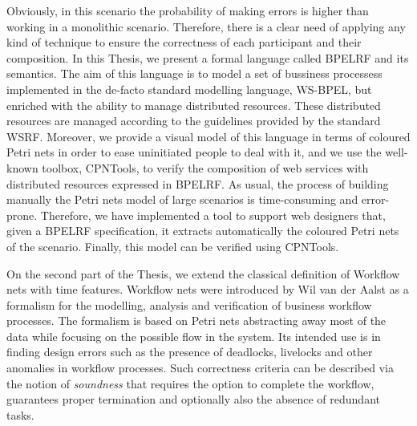 Obviously, in this scenario the probability of making errors is higher than working in a monolithic scenario. Therefore, there is
a clear need of applying any kind of technique to ensure the correctness of each participant and their composition.
In this Thesis, we present a formal language called BPELRF and its semantics. The aim of this language is
to model a set of bussiness processess implemented in the de-facto standard modelling language, WS-BPEL, but
enriched with the ability to manage distributed resources. These distributed resources are managed according to
the guidelines provided by the standard WSRF. Moreover, we provide a visual model of this language in terms of 
coloured Petri nets in order to ease uninitiated people to deal with it, and we use the well-known toolbox, CPNTools,
to verify the composition of web services with distributed resources expressed in BPELRF. As usual, the process of building manually
the Petri nets model of large scenarios is time-consuming and error-prone. Therefore,
we have implemented a tool to support web designers that, given a BPELRF specification, it extracts automatically the coloured 
Petri nets of the scenario. Finally, this model can be verified using CPNTools.

On the second part of the Thesis, we extend the classical definition of Workflow nets with time features. 
Workflow nets were introduced 
by Wil van der Aalst as a formalism
for the modelling, analysis and verification of business workflow processes.
The formalism is based on Petri nets abstracting away most of the data 
while focusing on the possible flow in the system. 
Its intended use is in finding design errors 
such as the presence of deadlocks, livelocks 
and other anomalies in workflow processes. Such correctness criteria can
be described via the notion of \emph{soundness} that
requires the option to complete the workflow, guarantees proper termination
and optionally also the absence of redundant tasks. 


